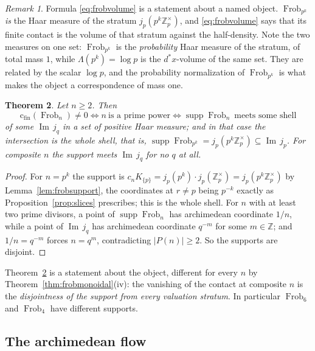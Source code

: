 \documentclass[11pt]{amsart}
\newtheorem{theorem}{Theorem}[section]
\theoremstyle{definition}
\theoremstyle{remark}
\newtheorem{remark}[theorem]{Remark}
\newcommand{\Z}{\mathbb Z}
\newcommand{\Iml}{\operatorname{Im}}
\newcommand{\Frob}{\operatorname{Frob}}
\newcommand{\supp}{\operatorname{supp}}
\newcommand{\cfin}{\mathrm{c}_{\mathrm{fin}}}
\begin{document}
\begin{remark}\label{rem:lambdaisownvolume}
Formula \eqref{eq:frobvolume} is a statement about a named object.
$\Frob_{p^k}$ \emph{is} the Haar measure of the stratum $j_p(p^k\Z_p^\times)$,
and \eqref{eq:frobvolume} says that its finite contact is the volume of that
stratum against the half-density. Note the two measures on one set:
$\Frob_{p^k}$ is the \emph{probability} Haar measure of the stratum, of total
mass $1$, while $\Lambda(p^k)=\log p$ is the $d^*x$-volume of the same set.
They are related by the scalar $\log p$, and the probability normalization of
$\Frob_{p^k}$ is what makes the object a correspondence of mass one.
\end{remark}

\begin{theorem}\label{thm:compositedisjoint}
Let $n\ge2$. Then
\[
  \cfin(\Frob_n)\ne0
  \iff n\ \text{is a prime power}
  \iff \supp\Frob_n\ \text{meets some shell}
\]
of some $\Iml\,j_q$ in a set of positive Haar measure; and in that case the intersection is the \emph{whole} shell, that is,
$\supp\Frob_{p^k}=j_p(p^k\Z_p^\times)\subseteq\Iml\,j_p$. For composite $n$ the
support meets $\Iml\,j_q$ for no $q$ at all.
\end{theorem}

\begin{proof}
For $n=p^k$ the support is $c_nK_{\{p\}}=j_p(p^k)\cdot j_p(\Z_p^\times)
=j_p(p^k\Z_p^\times)$ by Lemma~\ref{lem:frobsupport}, the coordinates at
$r\ne p$ being $p^{-k}$ exactly as Proposition~\ref{prop:slices} prescribes;
this is the whole shell. For $n$ with at least two prime divisors, a point of
$\supp\Frob_n$ has archimedean coordinate $1/n$, while a point of
$\Iml\,j_q$ has archimedean coordinate $q^{-m}$ for some $m\in\Z$; and
$1/n=q^{-m}$ forces $n=q^m$, contradicting $|P(n)|\ge2$. So the supports are
disjoint.
\end{proof}

Theorem~\ref{thm:compositedisjoint} is a statement about the object, different
for every $n$ by Theorem~\ref{thm:frobmonoidal}(iv): the vanishing of the
contact at composite $n$ is the \emph{disjointness of the support from every
valuation stratum}. In particular $\Frob_6$ and $\Frob_4$ have different supports.

\subsection{The archimedean flow}
\end{document}
